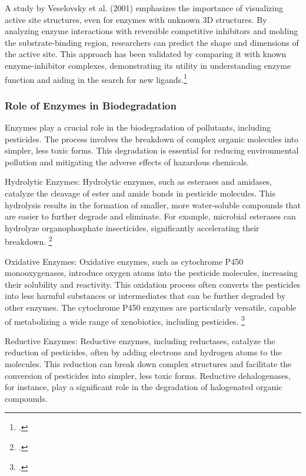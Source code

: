 A study by Veselovsky et al. (2001) emphasizes the importance of visualizing active site structures, even for enzymes with unknown 3D structures. By analyzing enzyme interactions with reversible competitive inhibitors and molding the substrate-binding region, researchers can predict the shape and dimensions of the active site. This approach has been validated by comparing it with known enzyme-inhibitor complexes, demonstrating its utility in understanding enzyme function and aiding in the search for new ligands.\footcite{veselovskyApproachVisualizationActive2001}

\subsubsection{Role of Enzymes in Biodegradation}
\label{sec:Role of Enzymes in Biodegradation}

Enzymes play a crucial role in the biodegradation of pollutants, including pesticides. The process involves the breakdown of complex organic molecules into simpler, less toxic forms. This degradation is essential for reducing environmental pollution and mitigating the adverse effects of hazardous chemicals.

Hydrolytic Enzymes: Hydrolytic enzymes, such as esterases and amidases, catalyze the cleavage of ester and amide bonds in pesticide molecules. This hydrolysis results in the formation of smaller, more water-soluble compounds that are easier to further degrade and eliminate. For example, microbial esterases can hydrolyze organophosphate insecticides, significantly accelerating their breakdown. \footcite{munneckeEnzymaticHydrolysisOrganophosphate1976}

Oxidative Enzymes: Oxidative enzymes, such as cytochrome P450 monooxygenases, introduce oxygen atoms into the pesticide molecules, increasing their solubility and reactivity. This oxidation process often converts the pesticides into less harmful substances or intermediates that can be further degraded by other enzymes. The cytochrome P450 enzymes are particularly versatile, capable of metabolizing a wide range of xenobiotics, including pesticides. \footcite{belloTheoreticalApproachMechanism2000}

Reductive Enzymes: Reductive enzymes, including reductases, catalyze the reduction of pesticides, often by adding electrons and hydrogen atoms to the molecules. This reduction can break down complex structures and facilitate the conversion of pesticides into simpler, less toxic forms. Reductive dehalogenases, for instance, play a significant role in the degradation of halogenated organic compounds.

